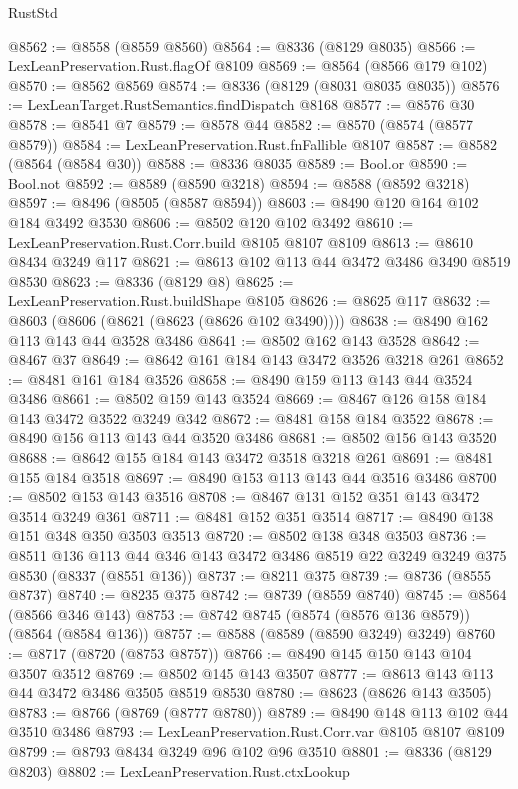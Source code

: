 \begin{lexlean}{RustStd}
\begin{coremodule}
{\begin{coremodule}
{{{{{{{{{{{{{{{{{{{{{{{{{{{{{{{{{{{{{{{{{{{{{@8562 := @8558 (@8559 @8560)
@8564 := @8336 (@8129 @8035)
@8566 := LexLeanPreservation.Rust.flagOf @8109
@8569 := @8564 (@8566 @179 @102)
@8570 := @8562 @8569
@8574 := @8336 (@8129 (@8031 @8035 @8035))
@8576 := LexLeanTarget.RustSemantics.findDispatch @8168
@8577 := @8576 @30
@8578 := @8541 @7
@8579 := @8578 @44
@8582 := @8570 (@8574 (@8577 @8579))
@8584 := LexLeanPreservation.Rust.fnFallible @8107
@8587 := @8582 (@8564 (@8584 @30))
@8588 := @8336 @8035
@8589 := Bool.or
@8590 := Bool.not
@8592 := @8589 (@8590 @3218)
@8594 := @8588 (@8592 @3218)
@8597 := @8496 (@8505 (@8587 @8594))
@8603 := @8490 @120 @164 @102 @184 @3492 @3530
@8606 := @8502 @120 @102 @3492
@8610 := LexLeanPreservation.Rust.Corr.build @8105 @8107 @8109
@8613 := @8610 @8434 @3249 @117
@8621 := @8613 @102 @113 @44 @3472 @3486 @3490 @8519 @8530
@8623 := @8336 (@8129 @8)
@8625 := LexLeanPreservation.Rust.buildShape @8105
@8626 := @8625 @117
@8632 := @8603 (@8606 (@8621 (@8623 (@8626 @102 @3490))))
@8638 := @8490 @162 @113 @143 @44 @3528 @3486
@8641 := @8502 @162 @143 @3528
@8642 := @8467 @37
@8649 := @8642 @161 @184 @143 @3472 @3526 @3218 @261
@8652 := @8481 @161 @184 @3526
@8658 := @8490 @159 @113 @143 @44 @3524 @3486
@8661 := @8502 @159 @143 @3524
@8669 := @8467 @126 @158 @184 @143 @3472 @3522 @3249 @342
@8672 := @8481 @158 @184 @3522
@8678 := @8490 @156 @113 @143 @44 @3520 @3486
@8681 := @8502 @156 @143 @3520
@8688 := @8642 @155 @184 @143 @3472 @3518 @3218 @261
@8691 := @8481 @155 @184 @3518
@8697 := @8490 @153 @113 @143 @44 @3516 @3486
@8700 := @8502 @153 @143 @3516
@8708 := @8467 @131 @152 @351 @143 @3472 @3514 @3249 @361
@8711 := @8481 @152 @351 @3514
@8717 := @8490 @138 @151 @348 @350 @3503 @3513
@8720 := @8502 @138 @348 @3503
@8736 := @8511
    @136
    @113
    @44
    @346
    @143
    @3472
    @3486
    @8519
    @22
    @3249
    @3249
    @375
    @8530
    (@8337 (@8551 @136))
@8737 := @8211 @375
@8739 := @8736 (@8555 @8737)
@8740 := @8235 @375
@8742 := @8739 (@8559 @8740)
@8745 := @8564 (@8566 @346 @143)
@8753 := @8742 @8745 (@8574 (@8576 @136 @8579)) (@8564 (@8584 @136))
@8757 := @8588 (@8589 (@8590 @3249) @3249)
@8760 := @8717 (@8720 (@8753 @8757))
@8766 := @8490 @145 @150 @143 @104 @3507 @3512
@8769 := @8502 @145 @143 @3507
@8777 := @8613 @143 @113 @44 @3472 @3486 @3505 @8519 @8530
@8780 := @8623 (@8626 @143 @3505)
@8783 := @8766 (@8769 (@8777 @8780))
@8789 := @8490 @148 @113 @102 @44 @3510 @3486
@8793 := LexLeanPreservation.Rust.Corr.var @8105 @8107 @8109
@8799 := @8793 @8434 @3249 @96 @102 @96 @3510
@8801 := @8336 (@8129 @8203)
@8802 := LexLeanPreservation.Rust.ctxLookup
}}}}}}}}}}}}}}}}}}}}}}}}}}}}}}}}}}}}}}}}}}}}}
\end{coremodule}}
\end{coremodule}
\end{lexlean}

